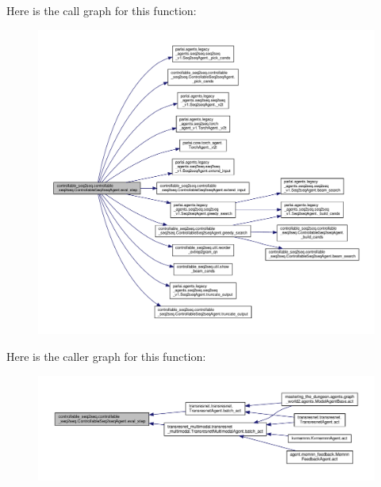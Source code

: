 Here is the call graph for this function\+:
\nopagebreak
\begin{figure}[H]
\begin{center}
\leavevmode
\includegraphics[width=350pt]{classcontrollable__seq2seq_1_1controllable__seq2seq_1_1ControllableSeq2seqAgent_a600aa2aca5941966727a8e02bb0430a3_cgraph}
\end{center}
\end{figure}
Here is the caller graph for this function\+:
\nopagebreak
\begin{figure}[H]
\begin{center}
\leavevmode
\includegraphics[width=350pt]{classcontrollable__seq2seq_1_1controllable__seq2seq_1_1ControllableSeq2seqAgent_a600aa2aca5941966727a8e02bb0430a3_icgraph}
\end{center}
\end{figure}
\mbox{\label{classcontrollable__seq2seq_1_1controllable__seq2seq_1_1ControllableSeq2seqAgent_ade83148e3cf61ac4c5149206000584c5}} 
